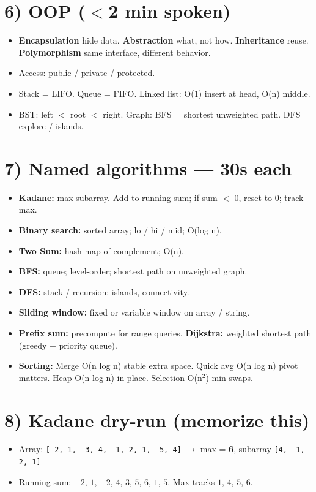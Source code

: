 \documentclass[a4paper,9pt]{extarticle}
\begin{document}
\section{6) OOP ($<$2 min spoken)}
\begin{itemize}
  \item \textbf{Encapsulation} hide data. \textbf{Abstraction} what, not how. \textbf{Inheritance} reuse. \textbf{Polymorphism} same interface, different behavior.
  \item Access: public / private / protected.
  \item Stack = LIFO. Queue = FIFO. Linked list: O(1) insert at head, O(n) middle.
  \item BST: left $<$ root $<$ right. Graph: BFS = shortest unweighted path. DFS = explore / islands.
\end{itemize}

\section{7) Named algorithms --- 30s each}
\begin{itemize}
  \item \textbf{Kadane:} max subarray. Add to running sum; if sum $<$ 0, reset to 0; track max.
  \item \textbf{Binary search:} sorted array; lo / hi / mid; O(log n).
  \item \textbf{Two Sum:} hash map of complement; O(n).
  \item \textbf{BFS:} queue; level-order; shortest path on unweighted graph.
  \item \textbf{DFS:} stack / recursion; islands, connectivity.
  \item \textbf{Sliding window:} fixed or variable window on array / string.
  \item \textbf{Prefix sum:} precompute for range queries. \textbf{Dijkstra:} weighted shortest path (greedy + priority queue).
  \item \textbf{Sorting:} Merge O(n log n) stable extra space. Quick avg O(n log n) pivot matters. Heap O(n log n) in-place. Selection O(n$^2$) min swaps.
\end{itemize}

\section{8) Kadane dry-run (memorize this)}
\begin{itemize}
  \item Array: \texttt{[-2, 1, -3, 4, -1, 2, 1, -5, 4]} $\to$ max = \textbf{6}, subarray \texttt{[4, -1, 2, 1]}
  \item Running sum: $-2$, $1$, $-2$, $4$, $3$, $5$, $6$, $1$, $5$. Max tracks $1$, $4$, $5$, $6$.
\end{itemize}
\end{document}
